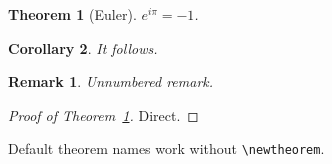 \documentclass{article}
\newtheorem{thm}{Theorem}
\newtheorem{cor}[thm]{Corollary}
\newtheorem*{rem}{Remark}
\begin{document}
\begin{thm}[Euler]\label{t:e}
$e^{i\pi} = -1$.
\end{thm}
\begin{cor}
It follows.
\end{cor}
\begin{rem}
Unnumbered remark.
\end{rem}
\begin{proof}[Proof of Theorem~\ref{t:e}]
Direct.
\end{proof}
\begin{lemma}
Default theorem names work without \verb|\newtheorem|.
\end{lemma}
\end{document}
